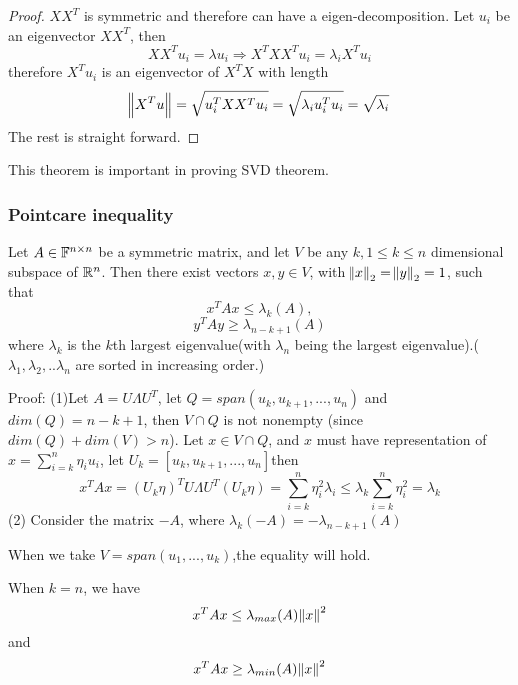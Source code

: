 \begin{refsection}
\begin{proof}
	$XX^T$ is symmetric and therefore can have a eigen-decomposition. Let $u_i$ be an eigenvector $XX^T$, then $$XX^T u_i = \lambda u_i \Rightarrow X^TXX^Tu_i = \lambda_i X^Tu_i$$
	therefore $X^Tu_i$ is an eigenvector of $X^TX$ with length $$\norm{X^Tu} = \sqrt{u_i^TXX^Tu_i} = \sqrt{\lambda_i u_i^Tu_i}=\sqrt{\lambda_i}$$
	The rest is straight forward.
\end{proof}


\begin{remark}
	This theorem is important in proving SVD theorem.
\end{remark}

\subsubsection{Pointcare inequality}

\begin{theorem}\label{ch:linearalgebra:th:pointcareinequality}
	\cite[126]{calafiore2014optimization} Let $A\in \mathbb{F}^{n\times n}$ be a symmetric matrix, and let $V$ be any $k,1\leq k\leq n$ dimensional subspace of $\mathbb{R}^n$. Then there exist vectors $x,y\in V$, with $\norm{x}_2 = \norm{y}_2 = 1$, such that
	$$x^TAx \leq \lambda_k(A),$$
	$$ y^TAy \geq \lambda_{n-k+1}(A)$$
	where $\lambda_k$ is the $k$th largest eigenvalue(with $\lambda_n$ being the largest eigenvalue).( $\lambda_1,\lambda_2,..\lambda_n$ are sorted in increasing order.)
\end{theorem}
Proof: (1)Let $A = U\Lambda U^T$, let $Q = span(u_k,u_{k+1},...,u_n)$ and $dim(Q) = n-k+1$, then $V\cap Q$ is not nonempty (since $dim(Q) + dim(V) > n$). Let $x\in V\cap Q$, and $x$ must have representation of $x = \sum_{i=k}^n \eta_i u_i$, let $U_k = [u_k,u_{k+1},...,u_n]$then
$$x^TAx = (U_k \eta)^T U\Lambda U^T (U_k \eta) = \sum_{i=k}^n \eta_i^2 \lambda_i \leq \lambda_k \sum_{i=k}^n \eta_i^2 = \lambda_k$$
(2) Consider the matrix $-A$, where $\lambda_k(-A) = -\lambda_{n-k+1}(A)$


\begin{remark}
	When we take $V = span(u_1,...,u_k)$,the equality will hold.
\end{remark}

\begin{remark}
	When $k=n$, we have 
	$$x^TAx \leq \lambda_{max}(A)\norm{x}^2$$
	and
	$$x^TAx \geq \lambda_{min}(A)\norm{x}^2$$
\end{remark}



\end{refsection}
